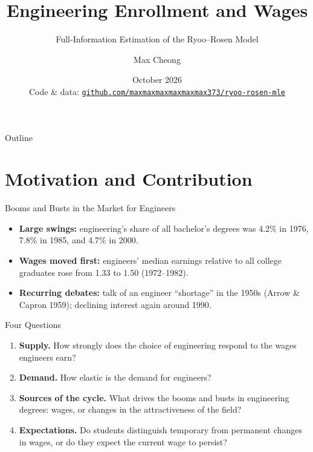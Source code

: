\documentclass[10pt]{beamer}
\title{Engineering Enrollment and Wages}
\subtitle{Full-Information Estimation of the Ryoo--Rosen Model}
\author{Max Cheong}
\institute{\small Guanghua School of Management, Peking University}
\date{October 2026\\[2ex]{\scriptsize Code \& data: \href{https://github.com/maxmaxmaxmaxmaxmax373/ryoo-rosen-mle}{\texttt{github.com/maxmaxmaxmaxmaxmax373/ryoo-rosen-mle}}}}
\begin{document}
\begin{frame}[plain]
  \titlepage
\end{frame}

\begin{frame}{Outline}
  \tableofcontents
\end{frame}

\section[Motivation]{Motivation and Contribution}

\begin{frame}{Booms and Busts in the Market for Engineers}
  \begin{itemize}
    \item \textbf{Large swings:} engineering's share of all bachelor's degrees was 4.2\% in 1976, \alert{7.8\%} in 1985, and 4.7\% in 2000.
    \item \textbf{Wages moved first:} engineers' median earnings relative to all college graduates rose from \alert{1.33 to 1.50} (1972--1982).
    \item \textbf{Recurring debates:} talk of an engineer ``shortage'' in the 1950s (Arrow \& Capron 1959); declining interest again around 1990.
  \end{itemize}
  \vspace{0.3cm}
  \begin{block}{Four Questions}
    \small
    \begin{enumerate}
      \item \textbf{Supply.} How strongly does the choice of engineering respond to the wages engineers earn?
      \item \textbf{Demand.} How elastic is the demand for engineers?
      \item \textbf{Sources of the cycle.} What drives the booms and busts in engineering degrees: wages, or changes in the attractiveness of the field?
      \item \textbf{Expectations.} Do students distinguish temporary from permanent changes in wages, or do they expect the current wage to persist?
    \end{enumerate}
  \end{block}
\end{frame}
\end{document}
